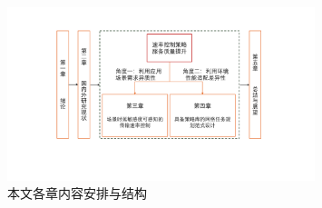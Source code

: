 \begin{figure} [ht]
\centering
\includegraphics[width=0.8\textwidth]{figures/chap01/arrange.pdf} 
\caption{本文各章内容安排与结构}
\label{fig:arrange}
\end{figure}
